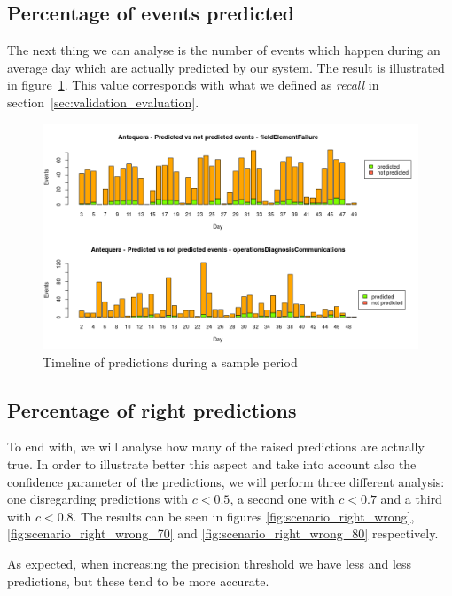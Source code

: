 \documentclass[a4paper,12pt]{article}
\begin{document}
\subsection{Percentage of events predicted}
The next thing we can analyse is the number of events which happen during an average day which are actually predicted by our system. The result is illustrated in figure~\ref{fig:scenario_pred_notpred}. This value corresponds with what we defined as \emph{recall} in section~\ref{sec:validation_evaluation}.

\begin{figure}[hbtp]
\includegraphics[width=\textwidth]{img/scenario_pred_notpred.png}
\caption{Timeline of predictions during a sample period} \label{fig:scenario_pred_notpred}
\end{figure}

\subsection{Percentage of right predictions}
To end with, we will analyse how many of the raised predictions are actually true. In order to illustrate better this aspect and take into account also the confidence parameter of the predictions, we will perform three different analysis: one disregarding predictions with $c < 0.5$, a second one with $c < 0.7$ and a third with $c < 0.8$. The results can be seen in figures \ref{fig:scenario_right_wrong}, \ref{fig:scenario_right_wrong_70} and \ref{fig:scenario_right_wrong_80} respectively.

As expected, when increasing the precision threshold we have less and less predictions, but these tend to be more accurate.
\end{document}

